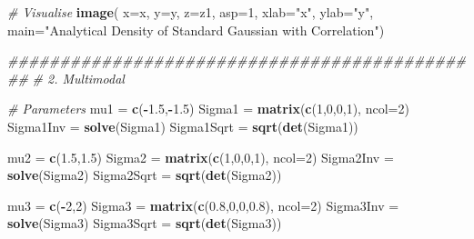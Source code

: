 \documentclass[
]{article}
\newenvironment{Shaded}{\begin{snugshade}}{\end{snugshade}}
\newcommand{\CommentTok}[1]{\textcolor[rgb]{0.56,0.35,0.01}{\textit{#1}}}
\newcommand{\DataTypeTok}[1]{\textcolor[rgb]{0.13,0.29,0.53}{#1}}
\newcommand{\DecValTok}[1]{\textcolor[rgb]{0.00,0.00,0.81}{#1}}
\newcommand{\FloatTok}[1]{\textcolor[rgb]{0.00,0.00,0.81}{#1}}
\newcommand{\KeywordTok}[1]{\textcolor[rgb]{0.13,0.29,0.53}{\textbf{#1}}}
\newcommand{\NormalTok}[1]{#1}
\newcommand{\OperatorTok}[1]{\textcolor[rgb]{0.81,0.36,0.00}{\textbf{#1}}}
\newcommand{\StringTok}[1]{\textcolor[rgb]{0.31,0.60,0.02}{#1}}
\begin{document}
\begin{Shaded}
\begin{Highlighting}[]
{\CommentTok{# Visualise}
\KeywordTok{image}\NormalTok{( }\DataTypeTok{x=}\NormalTok{x, }\DataTypeTok{y=}\NormalTok{y, }\DataTypeTok{z=}\NormalTok{z1,}
       \DataTypeTok{asp=}\DecValTok{1}\NormalTok{, }\DataTypeTok{xlab=}\StringTok{"x"}\NormalTok{, }\DataTypeTok{ylab=}\StringTok{"y"}\NormalTok{,}
       \DataTypeTok{main=}\StringTok{"Analytical Density of Standard Gaussian with Correlation"}\NormalTok{)}


\CommentTok{##############################################}
\CommentTok{# 2. Multimodal}

\CommentTok{# Parameters}
\NormalTok{mu1 =}\StringTok{ }\KeywordTok{c}\NormalTok{(}\OperatorTok{-}\FloatTok{1.5}\NormalTok{,}\OperatorTok{-}\FloatTok{1.5}\NormalTok{)}
\NormalTok{Sigma1 =}\StringTok{ }\KeywordTok{matrix}\NormalTok{(}\KeywordTok{c}\NormalTok{(}\DecValTok{1}\NormalTok{,}\DecValTok{0}\NormalTok{,}\DecValTok{0}\NormalTok{,}\DecValTok{1}\NormalTok{), }\DataTypeTok{ncol=}\DecValTok{2}\NormalTok{)}
\NormalTok{Sigma1Inv =}\StringTok{ }\KeywordTok{solve}\NormalTok{(Sigma1)}
\NormalTok{Sigma1Sqrt =}\StringTok{ }\KeywordTok{sqrt}\NormalTok{(}\KeywordTok{det}\NormalTok{(Sigma1))}

\NormalTok{mu2 =}\StringTok{ }\KeywordTok{c}\NormalTok{(}\FloatTok{1.5}\NormalTok{,}\FloatTok{1.5}\NormalTok{)}
\NormalTok{Sigma2 =}\StringTok{ }\KeywordTok{matrix}\NormalTok{(}\KeywordTok{c}\NormalTok{(}\DecValTok{1}\NormalTok{,}\DecValTok{0}\NormalTok{,}\DecValTok{0}\NormalTok{,}\DecValTok{1}\NormalTok{), }\DataTypeTok{ncol=}\DecValTok{2}\NormalTok{)}
\NormalTok{Sigma2Inv =}\StringTok{ }\KeywordTok{solve}\NormalTok{(Sigma2)}
\NormalTok{Sigma2Sqrt =}\StringTok{ }\KeywordTok{sqrt}\NormalTok{(}\KeywordTok{det}\NormalTok{(Sigma2))}

\NormalTok{mu3 =}\StringTok{ }\KeywordTok{c}\NormalTok{(}\OperatorTok{-}\DecValTok{2}\NormalTok{,}\DecValTok{2}\NormalTok{)}
\NormalTok{Sigma3 =}\StringTok{ }\KeywordTok{matrix}\NormalTok{(}\KeywordTok{c}\NormalTok{(}\FloatTok{0.8}\NormalTok{,}\DecValTok{0}\NormalTok{,}\DecValTok{0}\NormalTok{,}\FloatTok{0.8}\NormalTok{), }\DataTypeTok{ncol=}\DecValTok{2}\NormalTok{)}
\NormalTok{Sigma3Inv =}\StringTok{ }\KeywordTok{solve}\NormalTok{(Sigma3)}
\NormalTok{Sigma3Sqrt =}\StringTok{ }\KeywordTok{sqrt}\NormalTok{(}\KeywordTok{det}\NormalTok{(Sigma3))}

}
\end{Highlighting}
\end{Shaded}
\end{document}
